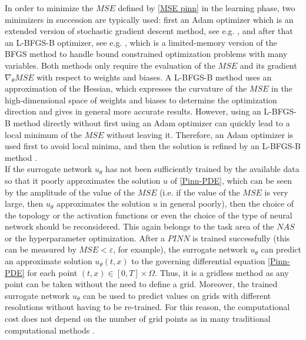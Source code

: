 In order to minimize the $MSE$ defined by \cref{MSE pinn} in the learning phase, two minimizers in succession are typically used: first an Adam optimizer which is an extended version of stochastic gradient descent method, see e.g. \cite{KingmaBa:2017}, and after that an L-BFGS-B optimizer, see e.g. \cite{ByrdLuNocedalZhu:1995}, which is a limited-memory version of the BFGS method to handle bound constrained optimization problems with many variables. Both methods only require the evaluation of the $MSE$ and its gradient $\nabla_\theta MSE$ with respect to weights and biases. A L-BFGS-B method uses an approximation of the Hessian, which expresses the curvature of the $MSE$ in the high-dimensional space of weights and biases to determine the optimization direction and gives in general more accurate results. However, using an L-BFGS-B method directly without first using an Adam optimizer can quickly lead to a local minimum of the $MSE$ without leaving it. Therefore, an Adam optimizer is used first to avoid local minima, and then the solution is refined by an L-BFGS-B method \cite[p.~6]{Markidis:2021}. \\
If the surrogate network $u_\theta$ has not been sufficiently trained by the available data so that it poorly approximates the solution $u$ of \cref{Pinn-PDE}, which can be seen by the amplitude of the value of the $MSE$ (i.e. if the value of the $MSE$ is very large, then $u_\theta$ approximates the solution $u$ in general poorly), then the choice of the topology or the activation functions or even the choice of the type of neural network should be reconsidered. This again belongs to the task area of the $NAS$ or the hyperparameter optimization. After a $PINN$ is trained successfully (this can be measured by $MSE < \varepsilon$, for example), the surrogate network $u_\theta$ can predict an approximate solution $u_\theta \left(t,x\right)$ to the governing differential equation \cref{Pinn-PDE} for each point $\left(t,x\right) \in \left[ 0, T \right] \times \Omega$. Thus, it is a gridless method as any point can be taken without the need to define a grid. Moreover, the trained surrogate network $u_\theta$ can be used to predict values on grids with different resolutions without having to be re-trained. For this reason, the computational cost does not depend on the number of grid points as in many traditional computational methods \cite[p.~2]{Markidis:2021}. \\
